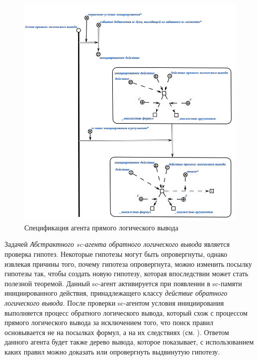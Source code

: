\begin{figure}[http]
	\includegraphics[scale=0.8]{author/part3/figures/direct_inference_agent.png}
	\caption{Спецификация агента прямого логического вывода}
	\label{fig:direct_inference_agent}
\end{figure}

Задачей \textit{Абстрактного sc-агента обратного логического вывода} является проверка гипотез. Некоторые гипотезы могут быть опровергнуты, однако извлекая причины того, почему гипотеза опровергнута, можно изменить посылку гипотезы так, чтобы создать новую гипотезу, которая впоследствии может стать полезной теоремой. Данный sc-агент активируется при появлении в sc-памяти инициированного действия, принадлежащего классу \textit{действие обратного логического вывода}. После проверки sc-агентом условия инициирования выполняется процесс обратного логического вывода, который схож с процессом прямого логического вывода за исключением того, что поиск правил основывается не на посылках формул, а на их следствиях (см. \textit{}). Ответом данного агента будет также дерево вывода, которое показывает, с использованием каких правил можно доказать или опровергнуть выдвинутую гипотезу.


